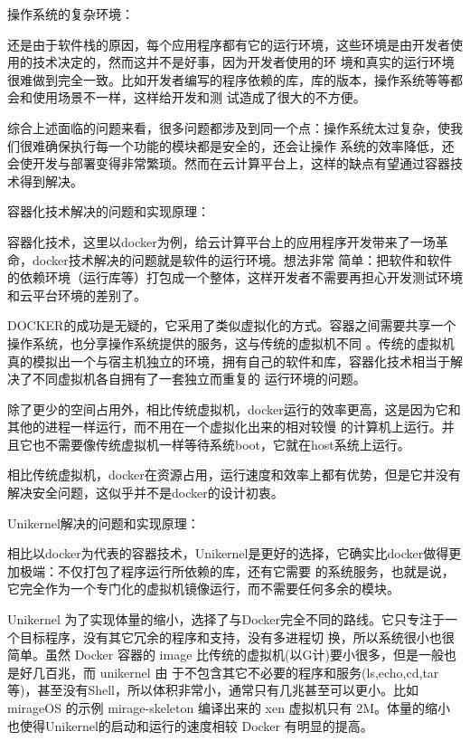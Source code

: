\documentclass[fontsize=13pt, %
    paper=a4, %
    twoside, %
    captions=tableheading,
    index=totoc,
    hyperref]{labbook}
\begin{document}
\begin{spacing}{1.0}
\begin{addmargin}[4cm]{0cm}
操作系统的复杂环境：

还是由于软件栈的原因，每个应用程序都有它的运行环境，这些环境是由开发者使用的技术决定的，然而这并不是好事，因为开发者使用的环
境和真实的运行环境很难做到完全一致。比如开发者编写的程序依赖的库，库的版本，操作系统等等都会和使用场景不一样，这样给开发和测
试造成了很大的不方便。

综合上述面临的问题来看，很多问题都涉及到同一个点：操作系统太过复杂，使我们很难确保执行每一个功能的模块都是安全的，还会让操作
系统的效率降低，还会使开发与部署变得非常繁琐。然而在云计算平台上，这样的缺点有望通过容器技术得到解决。



容器化技术解决的问题和实现原理：

容器化技术，这里以docker为例，给云计算平台上的应用程序开发带来了一场革命，docker技术解决的问题就是软件的运行环境。想法非常
简单：把软件和软件的依赖环境（运行库等）打包成一个整体，这样开发者不需要再担心开发测试环境和云平台环境的差别了。

DOCKER的成功是无疑的，它采用了类似虚拟化的方式。容器之间需要共享一个操作系统，也分享操作系统提供的服务，这与传统的虚拟机不同
。传统的虚拟机真的模拟出一个与宿主机独立的环境，拥有自己的软件和库，容器化技术相当于解决了不同虚拟机各自拥有了一套独立而重复的
运行环境的问题。

除了更少的空间占用外，相比传统虚拟机，docker运行的效率更高，这是因为它和其他的进程一样运行，而不用在一个虚拟化出来的相对较慢
的计算机上运行。并且它也不需要像传统虚拟机一样等待系统boot，它就在host系统上运行。

相比传统虚拟机，docker在资源占用，运行速度和效率上都有优势，但是它并没有解决安全问题，这似乎并不是docker的设计初衷。

Unikernel解决的问题和实现原理：

相比以docker为代表的容器技术，Unikernel是更好的选择，它确实比docker做得更加极端：不仅打包了程序运行所依赖的库，还有它需要
的系统服务，也就是说，它完全作为一个专门化的虚拟机镜像运行，而不需要任何多余的模块。

Unikernel 为了实现体量的缩小，选择了与Docker完全不同的路线。它只专注于一个目标程序，没有其它冗余的程序和支持，没有多进程切
换，所以系统很小也很简单。虽然 Docker 容器的 image 比传统的虚拟机(以G计)要小很多，但是一般也是好几百兆，而 unikernel 由
于不包含其它不必要的程序和服务(ls,echo,cd,tar等)，甚至没有Shell，所以体积非常小，通常只有几兆甚至可以更小。比如 mirageOS
的示例 mirage-skeleton 编译出来的 xen 虚拟机只有 2M。体量的缩小也使得Unikernel的启动和运行的速度相较 Docker 有明显的提高。


\end{addmargin}
\end{spacing}
\end{document}
